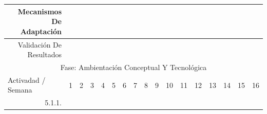 \documentclass[12pt]{article}
\begin{document}
\begin{table}[H]
{\begin{tabular}{|rllllllllllllllll|}
        \multicolumn{1}{|r|}{Mecanismos De Adaptación} & \multicolumn{1}{l|}{} & \multicolumn{1}{l|}{} & \multicolumn{1}{l|}{} & \multicolumn{1}{l|}{} & \multicolumn{1}{l|}{} & \multicolumn{1}{l|}{} & \multicolumn{1}{l|}{} & \multicolumn{1}{l|}{} & \multicolumn{1}{l|}{} & \multicolumn{1}{c|}{\cellcolor[HTML]{B4A7D6}} & \multicolumn{1}{c|}{\cellcolor[HTML]{B4A7D6}} & \multicolumn{1}{c|}{\cellcolor[HTML]{B4A7D6}} & \multicolumn{1}{c|}{\cellcolor[HTML]{EA9999}} & \multicolumn{1}{l|}{} & \multicolumn{1}{l|}{} &  \\ \hline
        \multicolumn{1}{|r|}{Validación De Resultados} & \multicolumn{1}{l|}{} & \multicolumn{1}{l|}{} & \multicolumn{1}{l|}{} & \multicolumn{1}{l|}{} & \multicolumn{1}{l|}{} & \multicolumn{1}{l|}{} & \multicolumn{1}{l|}{} & \multicolumn{1}{l|}{} & \multicolumn{1}{l|}{} & \multicolumn{1}{l|}{} & \multicolumn{1}{l|}{} & \multicolumn{1}{c|}{\cellcolor[HTML]{B4A7D6}} & \multicolumn{1}{c|}{\cellcolor[HTML]{EA9999}} & \multicolumn{1}{c|}{\cellcolor[HTML]{EA9999}} & \multicolumn{1}{c|}{\cellcolor[HTML]{EA9999}} & \multicolumn{1}{c|}{\cellcolor[HTML]{EA9999}} \\ \hline
        \multicolumn{17}{|c|}{\cellcolor[HTML]{D9D9D9}Fase: Ambientación Conceptual Y Tecnológica} \\ \hline
        \multicolumn{1}{|l|}{\cellcolor[HTML]{D9D9D9}Activadad / Semana} & \multicolumn{1}{c|}{\cellcolor[HTML]{B6D7A8}1} & \multicolumn{1}{c|}{\cellcolor[HTML]{B6D7A8}2} & \multicolumn{1}{c|}{\cellcolor[HTML]{B6D7A8}3} & \multicolumn{1}{c|}{\cellcolor[HTML]{B6D7A8}4} & \multicolumn{1}{c|}{\cellcolor[HTML]{A4C2F4}5} & \multicolumn{1}{c|}{\cellcolor[HTML]{A4C2F4}6} & \multicolumn{1}{c|}{\cellcolor[HTML]{A4C2F4}7} & \multicolumn{1}{c|}{\cellcolor[HTML]{A4C2F4}8} & \multicolumn{1}{c|}{\cellcolor[HTML]{B4A7D6}9} & \multicolumn{1}{c|}{\cellcolor[HTML]{B4A7D6}10} & \multicolumn{1}{c|}{\cellcolor[HTML]{B4A7D6}11} & \multicolumn{1}{c|}{\cellcolor[HTML]{B4A7D6}12} & \multicolumn{1}{c|}{\cellcolor[HTML]{EA9999}13} & \multicolumn{1}{c|}{\cellcolor[HTML]{EA9999}14} & \multicolumn{1}{c|}{\cellcolor[HTML]{EA9999}15} & \multicolumn{1}{c|}{\cellcolor[HTML]{EA9999}16} \\ \hline
        \multicolumn{1}{|r|}{5.1.1.} & \multicolumn{1}{c|}{\cellcolor[HTML]{B6D7A8}} & \multicolumn{1}{l|}{} & \multicolumn{1}{l|}{} & \multicolumn{1}{l|}{} & \multicolumn{1}{l|}{} & \multicolumn{1}{l|}{} & \multicolumn{1}{l|}{} & \multicolumn{1}{l|}{} & \multicolumn{1}{l|}{} & \multicolumn{1}{l|}{} & \multicolumn{1}{l|}{} & \multicolumn{1}{l|}{} & \multicolumn{1}{l|}{} & \multicolumn{1}{l|}{} & \multicolumn{1}{l|}{} &  \\ \hline

\end{tabular}}
\end{table}
\end{document}
